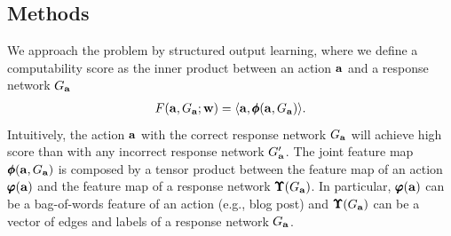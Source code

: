 {%
\subsection{Methods}
We approach the problem by structured output learning, where we define a computability score as the inner product between an action $\mathbf {a}$ and a response network $G_{\mathbf {a}}$
\begin{align*}
	F(\mathbf {a},G_{\mathbf {a}};\mathbf {w}) = \langle \mathbf {a}, \pmb \phi(\mathbf {a},G_{\mathbf {a}}) \rangle.
\end{align*}
Intuitively, the action $\mathbf {a}$ with the correct response network $G_{\mathbf {a}}$ will achieve high score than with any incorrect response network $G_{\mathbf {a}}'$.
The joint feature map $\pmb \phi(\mathbf {a},G_{\mathbf {a}})$ is composed by a tensor product between the feature map of an action $\pmb \varphi(\mathbf {a})$ and the feature map of a response network $\pmb \Upsilon(G_{\mathbf {a}})$.
In particular, $\pmb \varphi(\mathbf {a})$ can be a bag-of-words feature of an action (e.g., blog post) and $\pmb \Upsilon(G_{\mathbf {a}})$ can be a vector of edges and labels of a response network $G_{\mathbf {a}}$.

}
